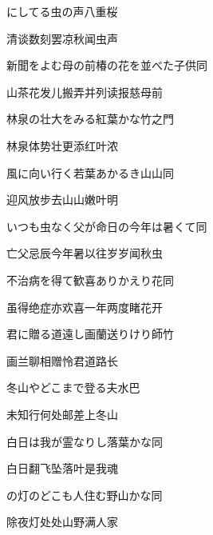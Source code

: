 \begin{haiku}
    {\FH {}にしてる虫の声}\hfill{\FH 八重桜}

    {\FK 清谈数刻罢凉秋闻虫声}
\end{haiku}

\begin{haiku}
    {\FH 新聞をよむ母の前椿の花を並べた子供}\hfill{\FH 同}

    {\FK 山茶花发儿搬弄并列读报慈母前}
\end{haiku}

\begin{haiku}
    {\FH 林泉の壮大をみる紅葉かな}\hfill{\FH 竹之門}

    {\FK 林泉体势壮更添红叶浓}
\end{haiku}

\begin{haiku}
    {\FH 風に向い行く若葉あかるき山山}\hfill{\FH 同}

    {\FK 迎风放步去山山嫩叶明}
\end{haiku}

\begin{haiku}
    {\FH いつも虫なく父が命日の今年は暑くて}\hfill{\FH 同}

    {\FK 亡父忌辰今年暑以往岁岁闻秋虫}
\end{haiku}

\begin{haiku}
    {\FH 不治病を得て歓喜ありかえり花}\hfill{\FH 同}

    {\FK 虽得绝症亦欢喜一年两度睹花开}
\end{haiku}

\begin{haiku}
    {\FH 君に贈る道遠し画蘭送りけり}\hfill{\FH 師竹}

    {\FK 画兰聊相赠怜君道路长}
\end{haiku}

\begin{haiku}
    {\FH 冬山やどこまで登る夫}\hfill{\FH 水巴}

    {\FK 未知行何处邮差上冬山}
\end{haiku}

\begin{haiku}
    {\FH 白日は我が霊なりし落葉かな}\hfill{\FH 同}

    {\FK 白日翻飞坠落叶是我魂}
\end{haiku}

\begin{haiku}
    {\FH {}の灯のどこも人住む野山かな}\hfill{\FH 同}

    {\FK 除夜灯处处山野满人家}
\end{haiku}

